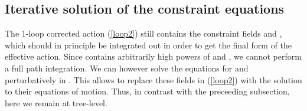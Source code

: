 \documentclass[a4paper,11pt]{article}
\begin{document}
\subsection{Iterative solution of the constraint equations}

The 1-loop corrected action (\ref{loop2}) still contains the constraint fields 
\coordHE{} and \myHighlight{$\phi$}\coordHE{}, which should in principle be integrated out in order to get
the final form of the effective action. Since \coordHE{} contains arbitrarily 
high powers of \coordHE{} and \myHighlight{$\phi$}\coordHE{}, we cannot perform a full path integration. 
We can however solve the equations for \coordHE{} and \myHighlight{$\phi$}\coordHE{} perturbatively in \coordHE{}. 
This allows to replace these fields in (\ref{loop2}) with the solution to their equations of motion. 
Thus, in contrast with the preceeding subsection, here we remain at tree-level.
\end{document}
